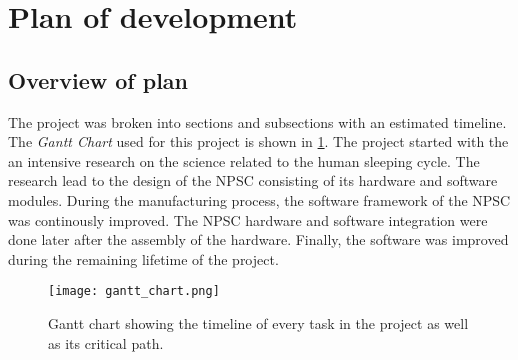 \section{Plan of development}

\subsection{Overview of plan}
The project was broken into sections and subsections with an estimated timeline.\\
The \textit{Gantt Chart} used for this project is shown in \cref{fig:gant}. The project started with the an intensive research on the science related to the human sleeping cycle. The research lead to the design of the NPSC consisting of its hardware and software modules. During the manufacturing process, the software framework of the NPSC was continously improved. The NPSC hardware and software integration were done later after the assembly of the hardware. Finally, the software was improved during the remaining lifetime of the project.
\begin{figure}[ht]
\centering
\texttt{[image: gantt\_chart.png]}
\caption{Gantt chart showing the timeline of every task in the project as well as its critical path.}
\label{fig:gant}
\end{figure}

